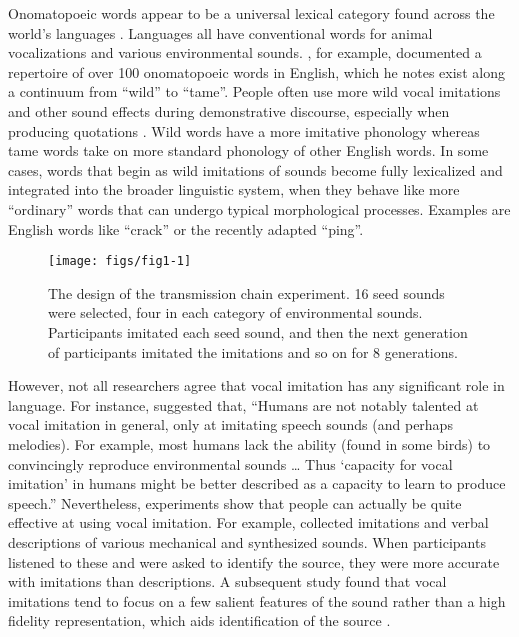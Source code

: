 \documentclass[10pt,letterpaper]{article}
\begin{document}
Onomatopoeic words appear to be a universal lexical category found
across the world's languages \citep{Dingemanse:2012fc}. Languages all
have conventional words for animal vocalizations and various
environmental sounds. \citet{Rhodes:1994au}, for example, documented a
repertoire of over 100 onomatopoeic words in English, which he notes
exist along a continuum from ``wild'' to ``tame''. People often use more
wild vocal imitations and other sound effects during demonstrative
discourse, especially when producing quotations
\citep{Blackwell:2015ix, Clark:1990cl}. Wild words have a more imitative
phonology whereas tame words take on more standard phonology of other
English words. In some cases, words that begin as wild imitations of
sounds become fully lexicalized and integrated into the broader
linguistic system, when they behave like more ``ordinary'' words that
can undergo typical morphological processes. Examples are English words
like ``crack'' or the recently adapted ``ping''.

\begin{figure}

{\centering \texttt{[image: figs/fig1-1]} 

}

\caption{The design of the transmission chain experiment. 16 seed sounds were selected, four in each category of environmental sounds. Participants imitated each seed sound, and then the next generation of participants imitated the imitations and so on for 8 generations.}\label{fig:fig1}
\end{figure}

However, not all researchers agree that vocal imitation has any
significant role in language. For instance, \citet{Pinker:2005cv}
suggested that, ``Humans are not notably talented at vocal imitation in
general, only at imitating speech sounds (and perhaps melodies). For
example, most humans lack the ability (found in some birds) to
convincingly reproduce environmental sounds \ldots{} Thus `capacity for
vocal imitation' in humans might be better described as a capacity to
learn to produce speech.'' Nevertheless, experiments show that people
can actually be quite effective at using vocal imitation. For example,
\citet{Lemaitre:2014kr} collected imitations and verbal descriptions of
various mechanical and synthesized sounds. When participants listened to
these and were asked to identify the source, they were more accurate
with imitations than descriptions. A subsequent study found that vocal
imitations tend to focus on a few salient features of the sound rather
than a high fidelity representation, which aids identification of the
source \citep{Lemaitre:2016kz}.
\end{document}

